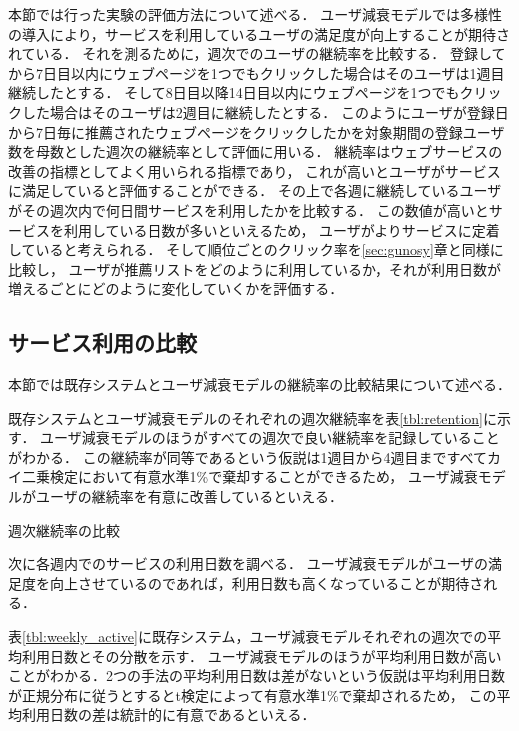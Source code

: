 \documentclass[japanese]{jnlp_1.4}
\begin{document}
本節では行った実験の評価方法について述べる．
ユーザ減衰モデルでは多様性の導入により，サービスを利用しているユーザの満足度が向上することが期待されている．
それを測るために，週次でのユーザの継続率を比較する．
登録してから7日目以内にウェブページを1つでもクリックした場合はそのユーザは1週目継続したとする．
そして8日目以降14日目以内にウェブページを1つでもクリックした場合はそのユーザは2週目に継続したとする．
このようにユーザが登録日から7日毎に推薦されたウェブページをクリックしたかを対象期間の登録ユーザ数を母数とした週次の継続率として評価に用いる．
継続率はウェブサービスの改善の指標としてよく用いられる指標であり，
これが高いとユーザがサービスに満足していると評価することができる．
その上で各週に継続しているユーザがその週次内で何日間サービスを利用したかを比較する．
この数値が高いとサービスを利用している日数が多いといえるため，
ユーザがよりサービスに定着していると考えられる．
そして順位ごとのクリック率を\ref{sec:gunosy}章と同様に比較し，
ユーザが推薦リストをどのように利用しているか，それが利用日数が増えるごとにどのように変化していくかを評価する．


\subsection{サービス利用の比較}

本節では既存システムとユーザ減衰モデルの継続率の比較結果について述べる．

既存システムとユーザ減衰モデルのそれぞれの週次継続率を表\ref{tbl:retention}に示す．
ユーザ減衰モデルのほうがすべての週次で良い継続率を記録していることがわかる．
この継続率が同等であるという仮説は1週目から4週目まですべてカイ二乗検定において有意水準1\%で棄却することができるため，
ユーザ減衰モデルがユーザの継続率を有意に改善しているといえる．

\begin{table}[b]
\caption{週次継続率の比較}
\label{tbl:retention}

\end{table}

次に各週内でのサービスの利用日数を調べる．
ユーザ減衰モデルがユーザの満足度を向上させているのであれば，利用日数も高くなっていることが期待される．

表\ref{tbl:weekly_active}に既存システム，ユーザ減衰モデルそれぞれの週次での平均利用日数とその分散を示す．
ユーザ減衰モデルのほうが平均利用日数が高いことがわかる．2つの手法の平均利用日数は差がないという仮説は平均利用日数が正規分布に従うとするとt検定によって有意水準1\%で棄却されるため，
この平均利用日数の差は統計的に有意であるといえる．
\end{document}
